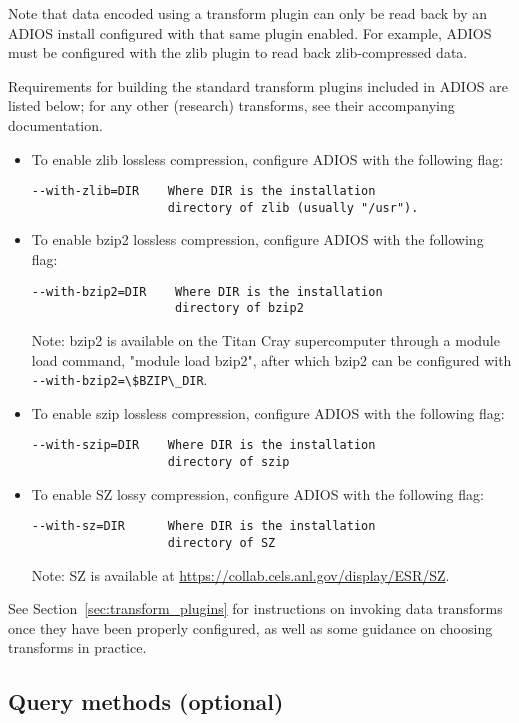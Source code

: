 Note that data encoded using a transform plugin can only be read
back by an ADIOS install configured with that same plugin enabled. For example,
ADIOS must be configured with the zlib plugin to read back zlib-compressed
data.

Requirements for building the standard transform plugins
included in ADIOS are listed below; for any other (research) transforms, see their accompanying
documentation.

\begin{itemize}
\item
To enable zlib lossless compression, configure ADIOS with the following flag:
\begin{lstlisting}
--with-zlib=DIR    Where DIR is the installation
                   directory of zlib (usually "/usr").
\end{lstlisting}

\item
To enable bzip2 lossless compression, configure ADIOS with the following flag:
\begin{lstlisting}
--with-bzip2=DIR    Where DIR is the installation
                    directory of bzip2
\end{lstlisting}
Note: bzip2 is available on the Titan Cray supercomputer through a module load command,
"module load bzip2", after which bzip2 can be configured with
\verb+--with-bzip2=\$BZIP\_DIR+.

\item
To enable szip lossless compression, configure ADIOS with the following flag:
\begin{lstlisting}
--with-szip=DIR    Where DIR is the installation
                   directory of szip
\end{lstlisting}
\item
To enable SZ lossy compression, configure ADIOS with the following flag:
\begin{lstlisting}
--with-sz=DIR      Where DIR is the installation
                   directory of SZ
\end{lstlisting}
Note: SZ is available at \url{https://collab.cels.anl.gov/display/ESR/SZ}.
\end{itemize}

See Section~\ref{sec:transform_plugins} for instructions on invoking data transforms once they have been properly configured,
as well as some guidance on choosing transforms in practice.


\subsection{Query methods (optional)}
\label{sec:installation-query-api}

